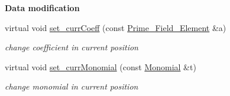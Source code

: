 \begin{Indent}\textbf{ Data modification}\par
\begin{DoxyCompactItemize}
\item 
\mbox{\label{class_d_b___polynomial___iterator_a1242df57986037208b87fb7a997db579}} 
virtual void \hyperlink{class_d_b___polynomial___iterator_a1242df57986037208b87fb7a997db579}{set\+\_\+curr\+Coeff} (const \hyperlink{class_prime___field___element}{Prime\+\_\+\+Field\+\_\+\+Element} \&a)
\begin{DoxyCompactList}\small\item\em change coefficient in current position \end{DoxyCompactList}\item 
\mbox{\label{class_d_b___polynomial___iterator_acf26240169346654925d24fb1eb5a6bc}} 
virtual void \hyperlink{class_d_b___polynomial___iterator_acf26240169346654925d24fb1eb5a6bc}{set\+\_\+curr\+Monomial} (const \hyperlink{class_monomial}{Monomial} \&t)
\begin{DoxyCompactList}\small\item\em change monomial in current position \end{DoxyCompactList}\end{DoxyCompactItemize}
\end{Indent}
